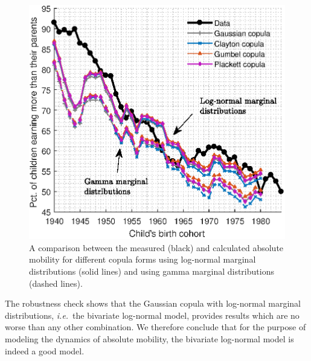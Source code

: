 \documentclass[12pt,a4paper]{article}
\newcommand{\ie}{{\it i.e.}\ }
\newcommand{\flabel}[1]{\label{fig:#1}}
\numberwithin{equation}{section}
\begin{document}
\begin{figure}[!htb]
\centering
\includegraphics[width=1.0\textwidth]{./figs/copulas3.eps}
\caption{A comparison between the measured (black) and calculated absolute mobility for different copula forms using log-normal marginal distributions (solid lines) and using gamma marginal distributions (dashed lines).}
\flabel{copulas1}
\end{figure}

The robustness check shows that the Gaussian copula with log-normal marginal distributions, \ie the bivariate log-normal model, provides results which are no worse than any other combination. We therefore conclude that for the purpose of modeling the dynamics of absolute mobility, the bivariate log-normal model is indeed a good model.
\end{document}
